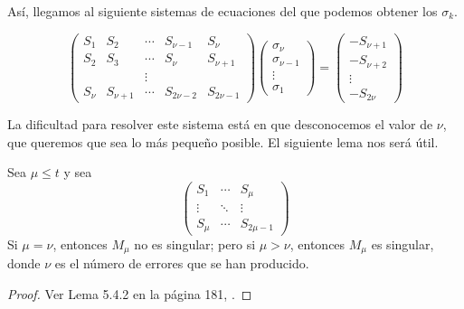 Así, llegamos al siguiente sistemas de ecuaciones del que podemos obtener los $\sigma_k$.

\begin{equation}
    \label{prop:sistema_polinomio_localizador_errores}
    \left(
        \begin{array}{ccccc}
            S_1 & S_2 & \cdots & S_{\nu - 1} & S_\nu \\
            S_2 & S_3 & \cdots & S_\nu & S_{\nu + 1} \\
                &     & \vdots &       &             \\
            S_\nu & S_{\nu + 1} & \cdots & S_{2\nu - 2} & S_{2\nu - 1}
        \end{array}
    \right)
    \left(
        \begin{array}{c}
            \sigma_\nu \\
            \sigma_{\nu - 1}\\ 
            \vdots \\
            \sigma_{1}
        \end{array}
    \right)
    = 
    \left(
        \begin{array}{c}
            -S_{\nu + 1} \\
            -S_{\nu + 2}\\ 
            \vdots \\
            -S_{2\nu}
        \end{array}
    \right)
\end{equation}

La dificultad para resolver este sistema está en que desconocemos el valor de $\nu$, que queremos que sea lo más pequeño posible. El siguiente lema nos será útil.

\begin{lemma}
    \label{lm:matriz_singular}
    Sea $\mu \leq t$ y sea 
    \[
        \left(
        \begin{array}{ccc}
            S_1 & \cdots & S_\mu \\
            \vdots & \ddots & \vdots \\
            S_\mu & \cdots & S_{2\mu - 1}
        \end{array}
        \right)
    \]
    Si $\mu = \nu$, entonces $M_\mu$ no es singular; pero si $\mu > \nu$, entonces $M_\mu$ es singular, donde $\nu$ es el número de errores que se han producido.
\end{lemma}

\begin{proof}
    Ver Lema 5.4.2 en la página 181, \cite{Huffman_Pless_2010}.
\end{proof}

